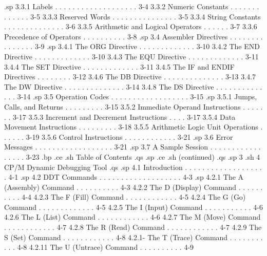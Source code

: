 .sp
        3.3.1  Labels . . . . . . . . . . . . . . . . . . .   3-4 
        3.3.2  Numeric Constants  . . . . . . . . . . . . .   3-5 
        3.3.3  Reserved Words . . . . . . . . . . . . . . .   3-5 
        3.3.4  String Constants . . . . . . . . . . . . . .   3-6 
        3.3.5  Arithmetic and Logical Operators . . . . . .   3-7 
        3.3.6  Precedence of Operators  . . . . . . . . . .   3-8 
.sp
   3.4  Assembler Directives  . . . . . . . . . . . . . . .   3-9 
.sp
        3.4.1  The ORG Directive  . . . . . . . . . . . . .  3-10 
        3.4.2  The END Directive  . . . . . . . . . . . . .  3-10 
        3.4.3  The EQU Directive  . . . . . . . . . . . . .  3-11 
        3.4.4  The SET Directive  . . . . . . . . . . . . .  3-11 
        3.4.5  The IF and ENDIF Directives  . . . . . . . .  3-12 
        3.4.6  The DB Directive . . . . . . . . . . . . . .  3-13 
        3.4.7  The DW Directive . . . . . . . . . . . . . .  3-14 
        3.4.8  The DS Directive . . . . . . . . . . . . . .  3-14 
.sp
   3.5  Operation Codes . . . . . . . . . . . . . . . . . .  3-15 
.sp
        3.5.1  Jumps, Calls, and Returns  . . . . . . . . .  3-15 
        3.5.2  Immediate Operand Instructions . . . . . . .  3-17 
        3.5.3  Increment and Decrement Instructions . . . .  3-17 
        3.5.4  Data Movement Instructions . . . . . . . . .  3-18 
        3.5.5  Arithmetic Logic Unit Operations . . . . . .  3-19 
        3.5.6  Control Instructions . . . . . . . . . . . .  3-21 
.sp
   3.6  Error Messages  . . . . . . . . . . . . . . . . . .  3-21 
.sp
   3.7  A Sample Session  . . . . . . . . . . . . . . . . .  3-23 
.bp
.ce
.sh
Table of Contents 
.qs
.sp
.ce
.sh
(continued)
.qs
.sp 3
.sh
4  CP/M Dynamic Debugging Tool  
.qs
.sp
   4.1  Introduction  . . . . . . . . . . . . . . . . . . .   4-1 
.sp
   4.2  DDT Commands  . . . . . . . . . . . . . . . . . . .   4-3 
.sp
        4.2.1  The A (Assembly) Command . . . . . . . . . .   4-3 
        4.2.2  The D (Display) Command  . . . . . . . . . .   4-4 
        4.2.3  The F (Fill) Command . . . . . . . . . . . .   4-5 
        4.2.4  The G (Go) Command . . . . . . . . . . . . .   4-5 
        4.2.5  The I (Input) Command  . . . . . . . . . . .   4-6 
        4.2.6  The L (List) Command . . . . . . . . . . . .   4-6 
        4.2.7  The M (Move) Command . . . . . . . . . . . .   4-7 
        4.2.8  The R (Read) Command . . . . . . . . . . . .   4-7 
        4.2.9  The S (Set) Command  . . . . . . . . . . . .   4-8 
        4.2.1- The T (Trace) Command  . . . . . . . . . . .   4-8 
        4.2.11 The U (Untrace) Command  . . . . . . . . . .   4-9 
